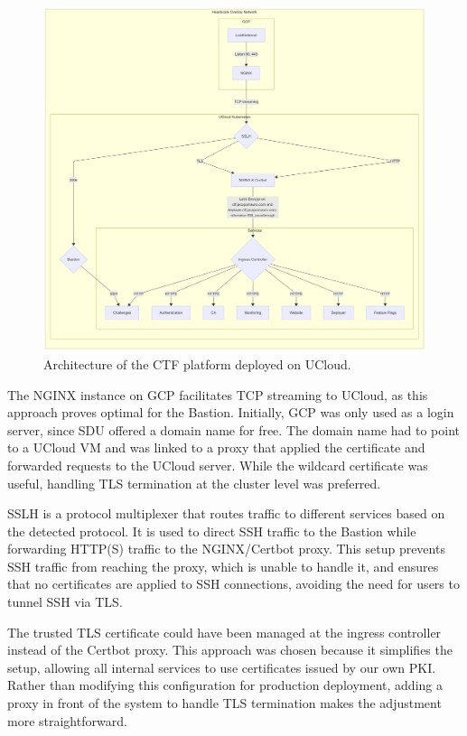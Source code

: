 \begin{figure}[h]
    \centering
    \includegraphics[width=1\textwidth]{images/ucloud-architecture.png}
    \caption{Architecture of the CTF platform deployed on UCloud.}
    \label{fig:architecture}
\end{figure}

The NGINX instance on GCP facilitates TCP streaming to UCloud, as this approach proves optimal for the Bastion. Initially, GCP was only used as a login server, since SDU offered a domain name for free. The domain name had to point to a UCloud VM and was linked to a proxy that applied the certificate and forwarded requests to the UCloud server. While the wildcard certificate was useful, handling TLS termination at the cluster level was preferred.

SSLH is a protocol multiplexer that routes traffic to different services based on the detected protocol. It is used to direct SSH traffic to the Bastion while forwarding HTTP(S) traffic to the NGINX/Certbot proxy. This setup prevents SSH traffic from reaching the proxy, which is unable to handle it, and ensures that no certificates are applied to SSH connections, avoiding the need for users to tunnel SSH via TLS.

The trusted TLS certificate could have been managed at the ingress controller instead of the Certbot proxy. This approach was chosen because it simplifies the setup, allowing all internal services to use certificates issued by our own PKI. Rather than modifying this configuration for production deployment, adding a proxy in front of the system to handle TLS termination makes the adjustment more straightforward.

